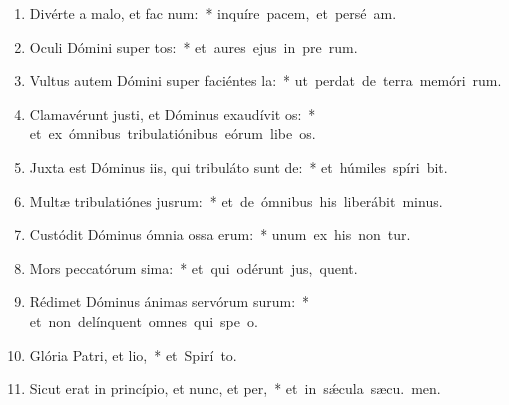 \begin{flushleft}
\begin{enumerate}[leftmargin=*]
\item Divérte a malo, et fac num:~* \mbox{inquíre pacem, et persé am.}

\item Oculi Dómini super tos:~* \mbox{et aures ejus in pre rum.}

\item Vultus autem Dómini super faciéntes la:~* \mbox{ut perdat de terra memóri rum.}

\item Clamavérunt justi, et Dóminus exaudívit os:~* \mbox{et ex ómnibus tribulatiónibus eórum libe os.}

\item Juxta est Dóminus iis, qui tribuláto sunt de:~* \mbox{et húmiles spíri bit.}

\item Multæ tribulatiónes jusrum:~* \mbox{et de ómnibus his liberábit  minus.}

\item Custódit Dóminus ómnia ossa erum:~* \mbox{unum ex his non tur.}

\item Mors peccatórum sima:~* \mbox{et qui odérunt jus, quent.}

\item Rédimet Dóminus ánimas servórum surum:~* \mbox{et non delínquent omnes qui spe  o.}

\item Glória Patri, et lio,~* \mbox{et Spirí to.}

\item Sicut erat in princípio, et nunc, et per,~* \mbox{et in sǽcula sæcu. men.}


\end{enumerate}
\end{flushleft}